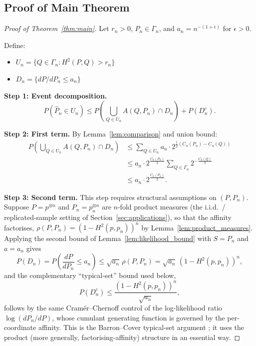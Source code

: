 \documentclass[preprint,review,12pt]{article}
\begin{document}
\subsection{Proof of Main Theorem}

\begin{proof}[Proof of Theorem~\ref{thm:main}]
Let $r_n > 0$, $P_n \in \Gamma_n$, and $a_n = n^{-(1+\epsilon)}$ for $\epsilon > 0$.

Define:
\begin{itemize}
	\item $U_n = \{Q \in \Gamma_n : H^2(P, Q) > r_n\}$
	\item $D_n = \{dP/dP_n \leq a_n\}$
\end{itemize}

\textbf{Step 1: Event decomposition.}
\[
P(\hat{P}_n \in U_n) \leq P\left( \bigcup_{Q \in U_n} A(Q, P_n) \cap D_n \right) + P(D_n^c).
\]

\textbf{Step 2: First term.} By Lemma~\ref{lem:comparison} and union bound:
\begin{align*}
	P\left( \bigcup_{Q \in U_n} A(Q, P_n) \cap D_n \right)
	&\leq \sum_{Q \in U_n} a_n \cdot 2^{\frac{1}{2}(C_n(P_n) - C_n(Q))} \\
	&\leq a_n \cdot 2^{\frac{C_n(P_n)}{2}} \sum_{Q \in \Gamma_n} 2^{-\frac{C_n(Q)}{2}} \\
	&\leq a_n \cdot 2^{\frac{C_n(P_n)}{2}}.
\end{align*}

\textbf{Step 3: Second term.} This step requires structural assumptions on
$(P, P_n)$. Suppose $P = p^{\otimes n}$ and $P_n = p_n^{\otimes n}$ are
$n$-fold product measures (the i.i.d.\ / replicated-sample setting of
Section~\ref{sec:applications}), so that the affinity factorises,
$\rho(P, P_n) = (1 - H^2(p, p_n))^n$ by Lemma~\ref{lem:product_measures}.
Applying the second bound of Lemma~\ref{lem:likelihood_bound} with $S = P_n$
and $a = a_n$ gives
\[
P(D_n) = P\!\left( \frac{dP}{dP_n} \leq a_n \right)
\leq \sqrt{a_n}\,\rho(P, P_n) = \sqrt{a_n}\,(1 - H^2(p, p_n))^n,
\]
and the complementary ``typical-set'' bound used below,
\[
P(D_n^c) \leq \frac{(1 - H^2(p, p_n))^n}{\sqrt{a_n}},
\]
follows by the same Cram\'er--Chernoff control of the log-likelihood ratio
$\log(dP_n/dP)$, whose cumulant generating function is governed by the
per-coordinate affinity. This is the Barron--Cover typical-set argument
\citep{Barron1991}; it uses the product (more generally, factorising-affinity)
structure in an essential way.


\end{proof}
\end{document}
